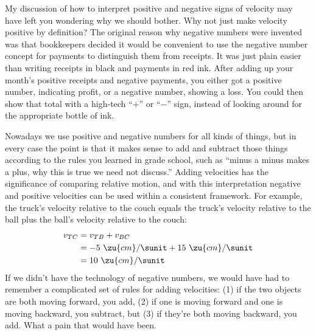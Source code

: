 My discussion of how to interpret positive and negative
signs of velocity may have left you wondering why we should
bother.  Why not just make velocity positive by definition?
The original reason why negative numbers were invented was
that bookkeepers decided it would be convenient to use the
negative number concept for payments to distinguish them
from receipts.  It was just plain easier than writing
receipts in black and payments in red ink.  After adding up
your month's positive receipts and negative payments, you
either got a positive number, indicating profit, or a
negative number, showing a loss.  You could then show 
that total with a high-tech ``$+$'' or ``$-$'' sign, instead
of looking around for the appropriate bottle of ink.

Nowadays we use positive and negative numbers for all kinds
of things, but in every case the point is that it makes
sense to add and subtract those things according to the
rules you learned in grade school, such as ``minus a minus
makes a plus, why this is true we need not discuss.'' Adding
velocities has the significance of comparing relative
motion, and with this interpretation negative and positive
velocities can be used within a consistent framework. For
example, the truck's velocity relative to the couch equals
the truck's velocity relative to the ball plus the ball's
velocity relative to the couch:
\begin{align*}
     v_{TC}    &=  v_{TB}+v_{BC}      \\
         &=  -5\ \zu{cm}/\sunit + 15\ \zu{cm}/\sunit  \\
         &=  10\ \zu{cm}/\sunit
\end{align*}
If we didn't have the technology of negative numbers, we
would have had to remember a complicated set of rules for
adding velocities: (1) if the two objects are both moving
forward, you add, (2) if one is moving forward and one is
moving backward, you subtract, but (3) if they're both
moving backward, you add.  What a pain that would have been.


